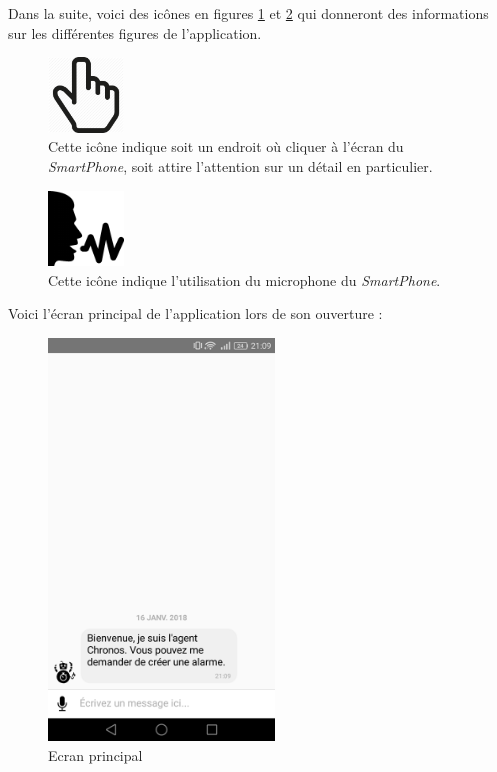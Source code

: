 Dans la suite, voici des icônes en figures \ref{hand} et \ref{voice} qui donneront des informations sur les différentes figures de l'application.

\begin{figure}[H]
  \centering
  \includegraphics[width=2cm]{images/hand.png}
  \caption{Cette icône indique soit un endroit où cliquer à l'écran du \emph{SmartPhone}, soit attire l'attention sur un détail en particulier.}
  \label{hand}
\end{figure}

\begin{figure}[H]
  \centering
  \includegraphics[width=2cm]{images/voice.png}
  \caption{Cette icône indique l'utilisation du microphone du \emph{SmartPhone}.}
  \label{voice}
\end{figure}

Voici l'écran principal de l'application lors de son ouverture :\\

\begin{figure}[H]
  \centering
  \includegraphics[width=6cm]{images/B1.png}
  \caption{Ecran principal}
  \label{B1}
\end{figure}

